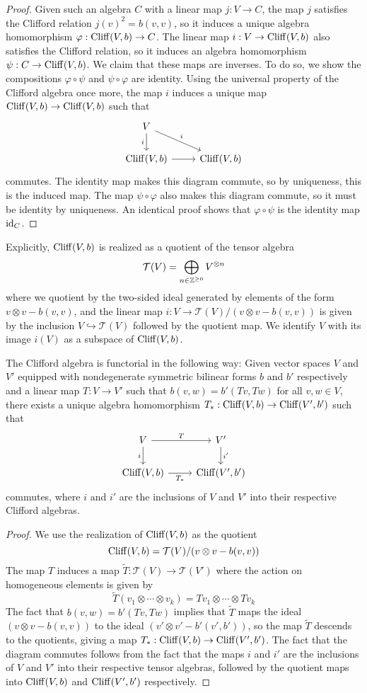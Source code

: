 \begin{proof}
Given such an algebra $C$ with a linear map $j: V \to C$, the map $j$
satisfies the Clifford relation $j(v)^2 = b(v,v)$, so it induces a unique algebra
homomorphism $\varphi : \operatorname{Cliff}(V,b) \to C$. The linear map $i : V \to \operatorname{Cliff}(V,b)$ also
satisfies the Clifford relation, so it induces an algebra homomorphism
$\psi : C \to \operatorname{Cliff}(V,b)$.
We claim that these maps are inverses. To do so, we show the compositions
$\varphi \circ \psi$ and $\psi \circ \varphi$ are identity. Using the
universal property of the Clifford algebra once more, the map $i$ induces
a unique map $\operatorname{Cliff}(V,b) \to \operatorname{Cliff}(V,b)$ such that
\[\begin{tikzcd}
V \ar[dr, "i"] \ar[d, "i"'] \\
\Cliff(V,b) \ar[r] & \Cliff(V,b)
\end{tikzcd}\]
commutes. The identity map makes this diagram commute, so by uniqueness, this is
the induced map. The map $\psi \circ \varphi$ also makes this diagram commute,
so it must be identity by uniqueness. An identical proof shows that
$\varphi \circ \psi$ is the identity map $\operatorname{id}_C$.
\end{proof}
%
Explicitly, $\operatorname{Cliff}(V,b)$ is realized as a quotient of the tensor algebra
\[
\mathcal{T}(V) = \bigoplus_{n \in \mathbb{Z}^{\geq 0}} V^{\otimes n}
\]
where we quotient by the two-sided ideal generated by elements of the form
$v \otimes v - b(v,v)$, and the linear map
$i: V \to \mathcal{T}(V) / (v \otimes v - b(v,v))$
is given by the inclusion $V \hookrightarrow \mathcal{T}(V)$ followed by the
quotient map. We identify $V$ with its image $i(V)$ as a subspace of $\operatorname{Cliff}(V,b)$.
%
\begin{thm}
The Clifford algebra is functorial in the following way: Given vector spaces
$V$ and $V'$ equipped with nondegenerate symmetric bilinear forms $b$ and $b'$
respectively and a linear map $T: V \to V'$ such that $b(v,w) = b'(Tv,Tw)$
for all $v,w \in V$, there exists a unique algebra homomorphism
$T_* : \operatorname{Cliff}(V,b) \to \operatorname{Cliff}(V',b')$
such that
\[\begin{tikzcd}
V \ar[r, "T"] \ar[d, "i"']& V' \ar[d, "i'"]\\
\Cliff(V,b) \ar[r, "T_*"'] & \Cliff(V',b')
\end{tikzcd}\]
commutes, where $i$ and $i'$ are the inclusions of $V$ and $V'$ into their
respective Clifford algebras.
\end{thm}
%
\begin{proof}
We use the realization of $\operatorname{Cliff}(V,b)$ as the quotient
\[
\operatorname{Cliff}(V,b) = \mathcal{T}(V) / (v \otimes v - b(v,v))
\]
The map $T$ induces a map $\tilde{T} : \mathcal{T}(V) \to \mathcal{T}(V')$
where the action on homogeneous elements is given by
\[
\tilde{T}(v_1 \otimes \cdots \otimes v_k) = Tv_1 \otimes \cdots \otimes Tv_k
\]
The fact that $b(v,w) = b'(Tv, Tw)$ implies that $\tilde{T}$ maps the
ideal $(v \otimes v - b(v,v))$ to the ideal $(v' \otimes v' - b'(v',b'))$, so
the map $\tilde{T}$ descends to the quotients, giving a map
$T_* : \operatorname{Cliff}(V,b) \to \operatorname{Cliff}(V',b')$. The fact that the diagram commutes
follows from the fact that the maps $i$ and $i'$ are the inclusions of
$V$ and $V'$ into their respective tensor algebras, followed by the quotient
maps into $\operatorname{Cliff}(V,b)$ and $\operatorname{Cliff}(V', b')$ respectively.
\end{proof}
